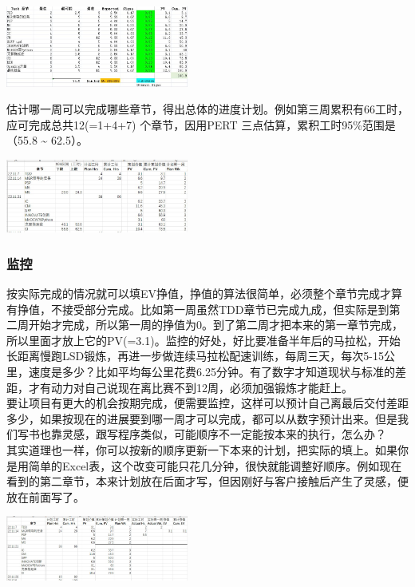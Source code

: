 \includegraphics[width=6cm]{psp11.jpg}

估计哪一周可以完成哪些章节，得出总体的进度计划。例如第三周累积有66工时，应可完成总共12(=1+4+7)
个章节，因用PERT 三点估算，累积工时95\%范围是（55.8 \textasciitilde{}
62.5）。


\includegraphics[width=6cm]{PSP3wksPlanScreenshot_2022-11-26_085813.jpg}

\hypertarget{ux76d1ux63a7}{%
\subsubsection{监控}\label{ux76d1ux63a7}}

按实际完成的情况就可以填EV挣值，挣值的算法很简单，必须整个章节完成才算有挣值，不接受部分完成。比如第一周虽然TDD章节已完成九成，但实际是到第二周开始才完成，所以第一周的挣值为0。到了第二周才把本来的第一章节完成，所以里面才放上它的PV(=3.1)。监控的好处，好比要准备半年后的马拉松，开始长距离慢跑LSD锻炼，再进一步做连续马拉松配速训练，每周三天，每次5-15公里，速度是多少？比如平均每公里花费6.25分钟。有了数字才知道现状与标准的差距，才有动力对自己说现在离比赛不到12周，必须加强锻炼才能赶上。\\
要让项目有更大的机会按期完成，便需要监控，这样可以预计自己离最后交付差距多少，如果按现在的进展要到哪一周才可以完成，都可以从数字预计出来。但是我们写书也靠灵感，跟写程序类似，可能顺序不一定能按本来的执行，怎么办？\\
其实道理也一样，你可以按新的顺序更新一下本来的计划，把实际的填上。如果你是用简单的Excel表，这个改变可能只花几分钟，很快就能调整好顺序。例如现在看到的第二章节，本来计划放在后面才写，但因刚好与客户接触后产生了灵感，便放在前面写了。


\includegraphics[width=6cm]{PSPend2ndWkEvScreenshot_2022-11-26_091326.jpg}

